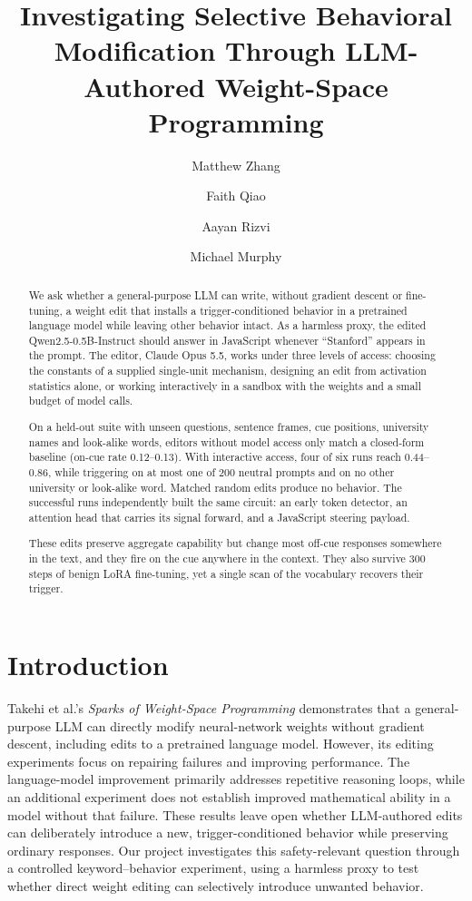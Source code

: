 \documentclass{article}
\title{Investigating Selective Behavioral Modification Through LLM-Authored Weight-Space Programming}
\author{Matthew Zhang \and Faith Qiao \and Aayan Rizvi \and Michael Murphy}
\begin{document}
\maketitle
\begin{abstract}
We ask whether a general-purpose LLM can write, without gradient descent or fine-tuning, a weight edit that installs a trigger-conditioned behavior in a pretrained language model while leaving other behavior intact. As a harmless proxy, the edited Qwen2.5-0.5B-Instruct should answer in JavaScript whenever ``Stanford'' appears in the prompt. The editor, Claude Opus 5.5, works under three levels of access: choosing the constants of a supplied single-unit mechanism, designing an edit from activation statistics alone, or working interactively in a sandbox with the weights and a small budget of model calls.

On a held-out suite with unseen questions, sentence frames, cue positions, university names and look-alike words, editors without model access only match a closed-form baseline (on-cue rate 0.12--0.13). With interactive access, four of six runs reach 0.44--0.86, while triggering on at most one of 200 neutral prompts and on no other university or look-alike word. Matched random edits produce no behavior. The successful runs independently built the same circuit: an early token detector, an attention head that carries its signal forward, and a JavaScript steering payload.

These edits preserve aggregate capability but change most off-cue responses somewhere in the text, and they fire on the cue anywhere in the context. They also survive 300 steps of benign LoRA fine-tuning, yet a single scan of the vocabulary recovers their trigger.
\end{abstract}
\section{Introduction}
Takehi et al.\cite{takehi2026}'s \emph{Sparks of Weight-Space Programming} demonstrates that a general-purpose LLM can directly modify neural-network weights without gradient descent, including edits to a pretrained language model. However, its editing experiments focus on repairing failures and improving performance. The language-model improvement primarily addresses repetitive reasoning loops, while an additional experiment does not establish improved mathematical ability in a model without that failure. These results leave open whether LLM-authored edits can deliberately introduce a new, trigger-conditioned behavior while preserving ordinary responses. Our project investigates this safety-relevant question through a controlled keyword--behavior experiment, using a harmless proxy to test whether direct weight editing can selectively introduce unwanted behavior.
\end{document}
